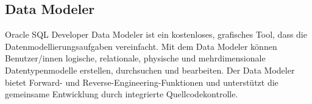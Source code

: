 \subsection{Data Modeler}
Oracle SQL Developer Data Modeler ist ein kostenloses, grafisches Tool, 
dass die Datenmodellierungsaufgaben vereinfacht. 
Mit dem Data Modeler können Benutzer/innen logische, relationale, physische und 
mehrdimensionale Datentypenmodelle erstellen, durchsuchen und bearbeiten. 
Der Data Modeler bietet Forward- und Reverse-Engineering-Funktionen und unterstützt die 
gemeinsame Entwicklung durch integrierte Quellcodekontrolle. \cite{noauthor_data_nodate}